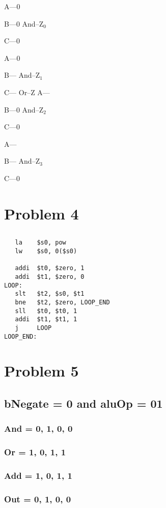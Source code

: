 \documentclass[11pt]{article}
\begin{document}
A---0

B---0   And--Z\(_{\text{0}}\)

C---0

A---0

B---    And--Z\(_{\text{1}}\)

C---
		     Or--Z
A---

B---0   And--Z\(_{\text{2}}\)

C---0

A---

B---    And--Z\(_{\text{3}}\)

C---0
\section{Problem 4}
\label{sec:orgfaa4082}
\subsection{}
\label{sec:org69492b3}
\begin{verbatim}
   la    $s0, pow
   lw    $s0, 0($s0)

   addi  $t0, $zero, 1
   addi  $t1, $zero, 0
LOOP:
   slt   $t2, $s0, $t1
   bne   $t2, $zero, LOOP_END
   sll   $t0, $t0, 1
   addi  $t1, $t1, 1
   j     LOOP
LOOP_END:
\end{verbatim}
\section{Problem 5}
\label{sec:org9c108e0}
\subsection{bNegate = 0 and aluOp = 01}
\label{sec:org124b09d}
\subsubsection{And = 0, 1, 0, 0}
\label{sec:org9411a62}
\subsubsection{Or  = 1, 0, 1, 1}
\label{sec:org255d895}
\subsubsection{Add = 1, 0, 1, 1}
\label{sec:org7b346cf}
\subsubsection{Out = 0, 1, 0, 0}
\label{sec:orgdc47b04}
\end{document}
